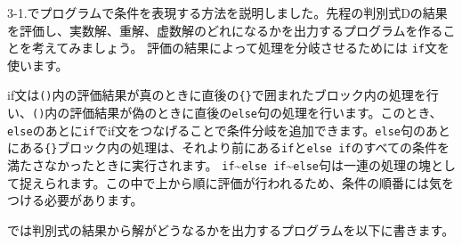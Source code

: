 3-1.でプログラムで条件を表現する方法を説明しました。先程の判別式Dの結果を評価し、実数解、重解、虚数解のどれになるかを出力するプログラムを作ることを考えてみましょう。
評価の結果によって処理を分岐させるためには \texttt{if}文を使います。

\begin{Shaded}
\begin{Highlighting}[]
\NormalTok{ (}\OperatorTok{\textless{}}\OperatorTok{\textgreater{}}\NormalTok{) \{}
\NormalTok{\} } \NormalTok{ (}\OperatorTok{\textless{}}\OperatorTok{\textgreater{}}\NormalTok{) \{}
\NormalTok{\} }\NormalTok{ \{}
\NormalTok{\}}
\end{Highlighting}
\end{Shaded}

if文は\texttt{()}内の評価結果が真のときに直後の\texttt{\{\}}で囲まれたブロック内の処理を行い、\texttt{()}内の評価結果が偽のときに直後の\texttt{else}句の処理を行います。このとき、\texttt{else}のあとに\texttt{if}でif文をつなげることで条件分岐を追加できます。\texttt{else}句のあとにある\texttt{\{\}}ブロック内の処理は、それより前にある\texttt{if}と\texttt{else\ if}のすべての条件を満たさなかったときに実行されます。
\texttt{if}\textasciitilde{}\texttt{else\ if}\textasciitilde{}\texttt{else}句は一連の処理の塊として捉えられます。この中で上から順に評価が行われるため、条件の順番には気をつける必要があります。

では判別式の結果から解がどうなるかを出力するプログラムを以下に書きます。

